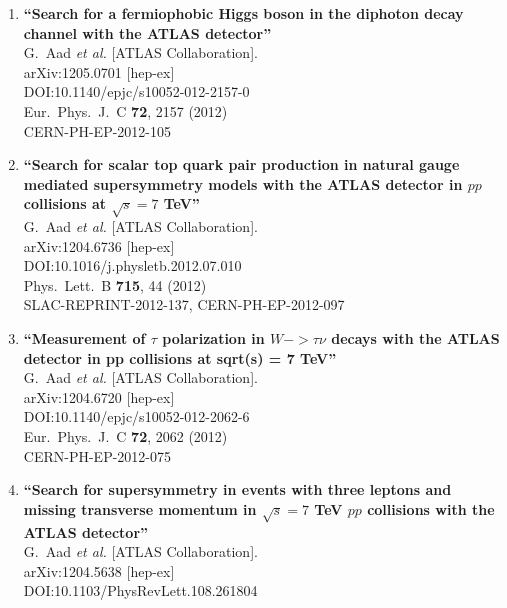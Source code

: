 \documentclass{article}
\begin{document}
\begin{enumerate}
\item%
{\bf ``Search for a fermiophobic Higgs boson in the diphoton decay channel with the ATLAS detector''}
  \\{}G.~Aad {\it et al.} [ATLAS Collaboration].
  \\{}arXiv:1205.0701 [hep-ex]
  \\{}DOI:10.1140/epjc/s10052-012-2157-0
  \\{}Eur.\ Phys.\ J.\ C {\bf 72}, 2157 (2012)
  \\{}CERN-PH-EP-2012-105
\item%
{\bf ``Search for scalar top quark pair production in natural gauge mediated supersymmetry models with the ATLAS detector in $pp$ collisions at $\sqrt{s}=7$ TeV''}
  \\{}G.~Aad {\it et al.} [ATLAS Collaboration].
  \\{}arXiv:1204.6736 [hep-ex]
  \\{}DOI:10.1016/j.physletb.2012.07.010
  \\{}Phys.\ Lett.\ B {\bf 715}, 44 (2012)
  \\{}SLAC-REPRINT-2012-137, CERN-PH-EP-2012-097
\item%
{\bf ``Measurement of $\tau$ polarization in $W -> \tau \nu$ decays with the ATLAS detector in pp collisions at sqrt(s) = 7 TeV''}
  \\{}G.~Aad {\it et al.} [ATLAS Collaboration].
  \\{}arXiv:1204.6720 [hep-ex]
  \\{}DOI:10.1140/epjc/s10052-012-2062-6
  \\{}Eur.\ Phys.\ J.\ C {\bf 72}, 2062 (2012)
  \\{}CERN-PH-EP-2012-075
\item%
{\bf ``Search for supersymmetry in events with three leptons and missing transverse momentum in $\sqrt{s}=7$ TeV $pp$ collisions with the ATLAS detector''}
  \\{}G.~Aad {\it et al.} [ATLAS Collaboration].
  \\{}arXiv:1204.5638 [hep-ex]
  \\{}DOI:10.1103/PhysRevLett.108.261804

\end{enumerate}
\end{document}
